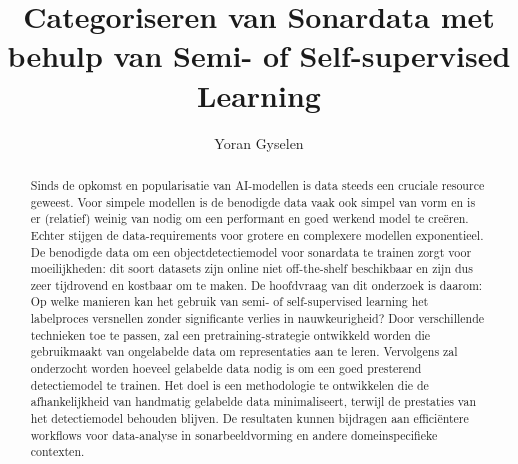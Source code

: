 \documentclass{hogent-article}
\title{Categoriseren van Sonardata met behulp van Semi- of Self-supervised Learning}
\author{Yoran Gyselen}
\begin{document}
\begin{abstract}
    Sinds de opkomst en popularisatie van AI-modellen is data steeds een cruciale resource geweest. Voor simpele modellen is de benodigde data vaak ook simpel van vorm en is er (relatief) weinig van nodig om een performant en goed werkend model te creëren. Echter stijgen de data-requirements voor grotere en complexere modellen exponentieel. De benodigde data om een objectdetectiemodel voor sonardata te trainen zorgt voor moeilijkheden: dit soort datasets zijn online niet off-the-shelf beschikbaar en zijn dus zeer tijdrovend en kostbaar om te maken. De hoofdvraag van dit onderzoek is daarom: Op welke manieren kan het gebruik van semi- of self-supervised learning het labelproces versnellen zonder significante verlies in nauwkeurigheid? Door verschillende technieken toe te passen, zal een pretraining-strategie ontwikkeld worden die gebruikmaakt van ongelabelde data om representaties aan te leren. Vervolgens zal onderzocht worden hoeveel gelabelde data nodig is om een goed presterend detectiemodel te trainen. Het doel is een methodologie te ontwikkelen die de afhankelijkheid van handmatig gelabelde data minimaliseert, terwijl de prestaties van het detectiemodel behouden blijven. De resultaten kunnen bijdragen aan efficiëntere workflows voor data-analyse in sonarbeeldvorming en andere domeinspecifieke contexten.
\end{abstract}

\tableofcontents



\printbibliography[heading=bibintoc]
\end{document}
